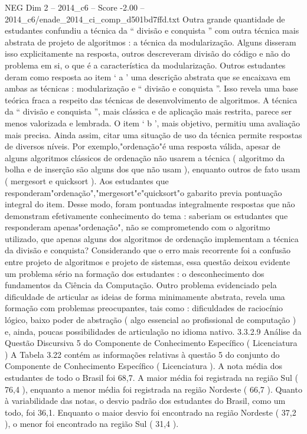 \begin{textsample}{NEG Dim 2 – 2014\_c6 – Score -2.00 – 2014\_c6/enade\_2014\_ci\_comp\_d501bd7ffd.txt}
Outra grande quantidade de estudantes confundiu a técnica da “ divisão e conquista ” com outra técnica mais abstrata de projeto de algoritmos : a técnica da modularização.
Alguns disseram isso explicitamente na resposta, outros descreveram divisão do código e não do problema em si, o que é a característica da modularização.
Outros estudantes deram como resposta ao item ‘ a ’ uma descrição abstrata que se encaixava em ambas as técnicas : modularização e “ divisão e conquista ”.
Isso revela uma base teórica fraca a respeito das técnicas de desenvolvimento de algoritmos.
A técnica da “ divisão e conquista ”, mais clássica e de aplicação mais restrita, parece ser menos valorizada e lembrada.
O item ‘ b ’, mais objetivo, permitiu uma avaliação mais precisa.
Ainda assim, citar uma situação de uso da técnica permite respostas de diversos níveis.
Por exemplo,"ordenação"é uma resposta válida, apesar de alguns algoritmos clássicos de ordenação não usarem a técnica ( algoritmo da bolha e de inserção são alguns dos que não usam ), enquanto outros de fato usam ( mergesort e quicksort ).
Aos estudantes que responderam"ordenação","mergesort"e"quicksort"o gabarito previa pontuação integral do item.
Desse modo, foram pontuadas integralmente respostas que não demonstram efetivamente conhecimento do tema : saberiam os estudantes que responderam apenas"ordenação", não se comprometendo com o algoritmo utilizado, que apenas alguns dos algoritmos de ordenação implementam a técnica da divisão e conquista?
Considerando que o erro mais recorrente foi a confusão entre projeto de algoritmos e projeto de sistemas, essa questão deixou evidente um problema sério na formação dos estudantes : o desconhecimento dos fundamentos da Ciência da Computação.
Outro problema evidenciado pela dificuldade de articular as ideias de forma minimamente abstrata, revela uma formação com problemas preocupantes, tais como : dificuldades de raciocínio lógico, baixo poder de abstração ( algo essencial ao profissional de computação ) e, ainda, poucas possibilidades de articulação no idioma nativo. 3.3.2.9 Análise da Questão Discursiva 5 do Componente de Conhecimento Específico ( Licenciatura ) A Tabela 3.22 contém as informações relativas à questão 5 do conjunto do Componente de Conhecimento Específico ( Licenciatura ).
A nota média dos estudantes de todo o Brasil foi 68,7.
A maior média foi registrada na região Sul ( 76,4 ), enquanto a menor média foi registrada na região Nordeste ( 66,7 ).
Quanto à variabilidade das notas, o desvio padrão dos estudantes do Brasil, como um todo, foi 36,1.
Enquanto o maior desvio foi encontrado na região Nordeste ( 37,2 ), o menor foi encontrado na região Sul ( 31,4 ).

\end{textsample}
